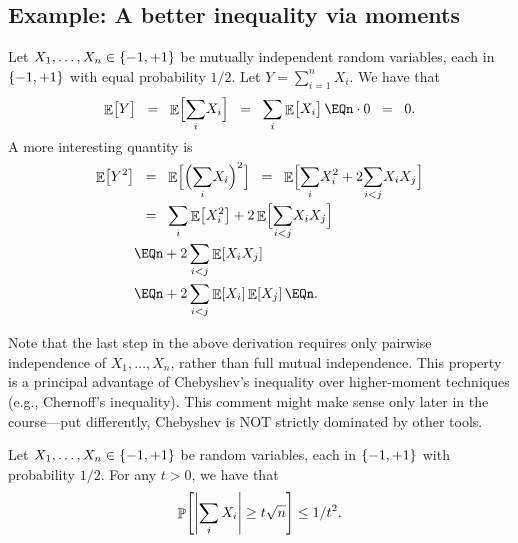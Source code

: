 \subsection{Example: A better inequality via moments}


Let $X_1, \ldots, X_n \in \left\{ {-1,+1} \right\}$ be mutually independent random variables,
each  in $\left\{ {-1,+1} \right\}$ with equal probability $1/2$. Let
$Y= \sum_{i=1}^n X_i$. We have that
\begin{equation*}
    \Ex{Y\bigr.}%
    \EQ%
    \Ex{\Bigl. \smash{\sum_i} X_i}%
    \EQ%
    \smash{\sum_i} \Ex{X_i \bigr.}%
    \EQ%
    n \cdot 0%
    \EQ
    0.
\end{equation*}

A more interesting quantity is
\begin{align*}
  \Ex{Y^2} %
  &\EQ%
    \Ex{ \smash{\Bigl(\smash{\sum_i} X_i\Bigr)^2} \Bigr.}%
    \EQ%
    \Ex{\Bigl. \smash{\sum_i} X_i^2 + 2 \smash{\sum_{i < j}} X_i X_j}%
    \\[.2cm]&
    \EQ%
    \sum_i \Ex{  X_i^2} + 2\Ex{  \smash{\sum_{i < j}} X_i X_j \Bigr.}%
    \\&
    \EQ%
    n  + 2 \sum_{i < j} \Ex{ X_i X_j}%
  \\&%
  \EQ%
  n + 2 \sum_{i < j} \Ex{ X_i} \Ex{ X_j}%
  \EQ%
  n.
\end{align*}

\begin{remark}
    Note that the last step in the above derivation requires only
    pairwise independence of $X_1, \ldots, X_n$, rather than full mutual
    independence. This property is a principal advantage of Chebyshev's
    inequality over higher-moment techniques (e.g., Chernoff's
    inequality). This comment might make sense only later in the
    course---put differently, Chebyshev is NOT strictly dominated by
    other tools.
\end{remark}

\begin{lemma}
    Let $X_1, \ldots, X_n \in \left\{ {-1,+1} \right\}$ be  random variables, each
     in $\left\{ {-1, +1} \right\}$ with probability $1/2$. For any
    $t > 0$, we have that
    \begin{equation*}
        \Prob{ \cardin{\sum_i X_i} \geq t \sqrt{n}} \leq 1/t^2.
    \end{equation*}
\end{lemma}

